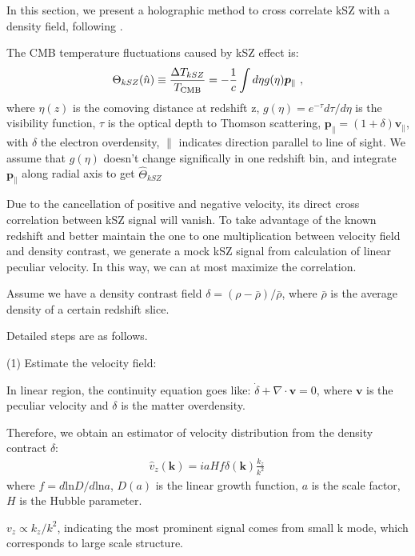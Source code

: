 In this section, we present a holographic method 
to cross correlate kSZ with a density field, 
following \cite{Shao11}. 

\label{sec:kszRecon}
The CMB temperature fluctuations caused by kSZ effect is:
\begin{eqnarray}
\label{eq:ksz}
\Theta_{kSZ}(\hat n)\equiv\frac{\Delta T_{kSZ}}{T_{\mathrm{CMB}}}
=-\frac{1}{c}\int d\eta  g(\eta)  \bm{p}_\parallel\ ,
\end{eqnarray}
where $\eta(z)$ is the comoving distance at redshift z, $g(\eta)=e^{-\tau} d\tau/d\eta$ is the visibility function, $\tau$ is the optical depth to Thomson scattering, $\bm{p}_\parallel=(1+\delta)\bm{v}_\parallel$, with $\delta$ the electron overdensity, $\parallel$ indicates direction parallel to line of sight. 
We assume that $g(\eta)$ doesn't change significally in one redshift bin, 
and integrate $\bm{p}_\parallel$ along radial axis to get $\hat \Theta_{kSZ}$

Due to the cancellation of positive and negative velocity, its direct cross correlation between kSZ signal will vanish.
To take advantage of the known redshift and better maintain the one to one multiplication between velocity field and density contrast,   
we generate a mock kSZ signal from calculation of linear peculiar velocity. 
In this way, we can at most maximize the correlation.

Assume we have a density contrast field $\delta=(\rho-\bar{\rho})/\bar{\rho}$, where $\bar\rho$ is the average density of a certain redshift slice. 

Detailed steps are as follows.

(1) Estimate the velocity field:

In linear region, the continuity equation goes like:
$\dot \delta+\nabla \cdot \bm{v}=0$, 
where $\bm{v}$ is the peculiar velocity and $\delta$ is the matter overdensity. 

Therefore, we obtain an estimator of velocity distribution from the density contract $\delta$:
\begin{eqnarray}
	\label{eq:v}
\hat v_z(\bm{k})=i a H f\delta(\bm{k})\frac{k_z}{k^2}\,
\end{eqnarray}
where $f=d\mathrm{ln}D/d\mathrm{ln}a$, $D(a)$ is the linear growth function, 
$a$ is the scale factor, $H$ is the Hubble parameter.

$v_z \propto k_z/k^2$, indicating the most prominent signal comes from small k mode, which corresponds to large scale structure. 

